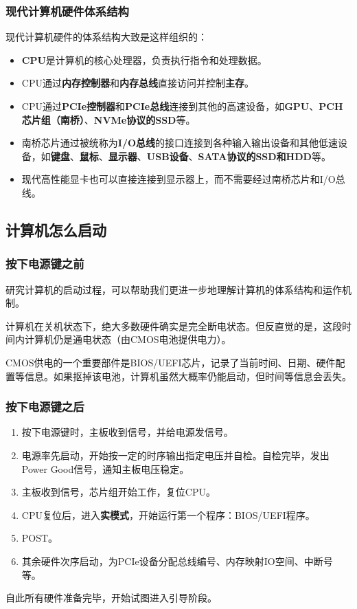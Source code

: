 \documentclass[fontset=none,aspectratio=1610]{ctexbeamer}
\begin{document}
\begin{frame}
    \frametitle{现代计算机硬件体系结构}
    
    现代计算机硬件的体系结构大致是这样组织的：
    \begin{itemize}
        \item \textbf{CPU}是计算机的核心处理器，负责执行指令和处理数据。
        \item CPU通过\textbf{内存控制器}和\textbf{内存总线}直接访问并控制\textbf{主存}。
        \item CPU通过\textbf{PCIe控制器}和\textbf{PCIe总线}连接到其他的高速设备，如\textbf{GPU}、\textbf{PCH芯片组（南桥）}、\textbf{NVMe协议的SSD}等。
        \item 南桥芯片通过被统称为\textbf{I/O总线}的接口连接到各种输入输出设备和其他低速设备，如\textbf{键盘}、\textbf{鼠标}、\textbf{显示器}、\textbf{USB设备}、\textbf{SATA协议的SSD和HDD}等。
        \item 现代高性能显卡也可以直接连接到显示器上，而不需要经过南桥芯片和I/O总线。
    \end{itemize}

\end{frame}

\subsection{计算机怎么启动}

\begin{frame}
    \frametitle{按下电源键之前}

    研究计算机的启动过程，可以帮助我们更进一步地理解计算机的体系结构和运作机制。

    计算机在关机状态下，绝大多数硬件确实是完全断电状态。但反直觉的是，这段时间内计算机仍是通电状态（由CMOS电池提供电力）。
    
    CMOS供电的一个重要部件是BIOS/UEFI芯片，记录了当前时间、日期、硬件配置等信息。如果抠掉该电池，计算机虽然大概率仍能启动，但时间等信息会丢失。

\end{frame}

\begin{frame}
    \frametitle{按下电源键之后}

    \begin{enumerate}
        \item 按下电源键时，主板收到信号，并给电源发信号。
        \item 电源率先启动，开始按一定的时序输出指定电压并自检。自检完毕，发出Power Good信号，通知主板电压稳定。
        \item 主板收到信号，芯片组开始工作，复位CPU。
        \item CPU复位后，进入\textbf{实模式}，开始运行第一个程序：BIOS/UEFI程序。
        \item POST。
        \item 其余硬件次序启动，为PCIe设备分配总线编号、内存映射IO空间、中断号等。
    \end{enumerate}

    自此所有硬件准备完毕，开始试图进入引导阶段。

\end{frame}
\end{document}
